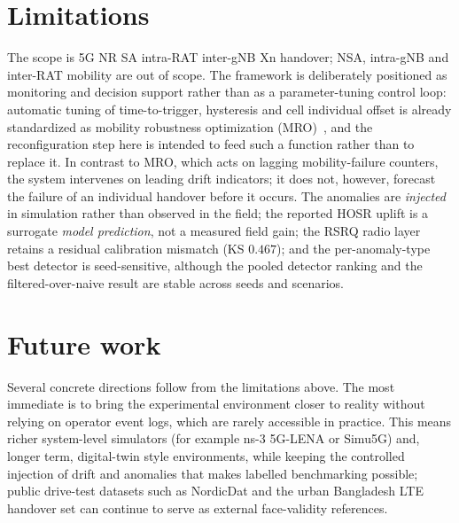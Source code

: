 \section{Limitations}

The scope is 5G NR SA intra-RAT inter-gNB Xn handover; NSA, intra-gNB and
inter-RAT mobility are out of scope. The framework is deliberately positioned as
monitoring and decision support rather than as a parameter-tuning control loop:
automatic tuning of time-to-trigger, hysteresis and cell individual offset is
already standardized as mobility robustness optimization (MRO)~\cite{tr36839,ts28313},
and the reconfiguration step here is intended to feed such a function rather than
to replace it. In contrast to MRO, which acts on lagging mobility-failure
counters, the system intervenes on leading drift indicators; it does not,
however, forecast the failure of an individual handover before it occurs. The
anomalies are \emph{injected} in
simulation rather than observed in the field; the reported HOSR uplift is a
surrogate \emph{model prediction}, not a measured field gain; the RSRQ radio
layer retains a residual calibration mismatch (KS $0.467$); and the
per-anomaly-type best detector is seed-sensitive, although the pooled detector
ranking and the filtered-over-naive result are stable across seeds and scenarios.

\section{Future work}

Several concrete directions follow from the limitations above. The most immediate
is to bring the experimental environment closer to reality without relying on
operator event logs, which are rarely accessible in practice. This means richer
system-level simulators (for example ns-3 5G-LENA or Simu5G) and, longer term,
digital-twin style environments, while keeping the controlled injection of drift
and anomalies that makes labelled benchmarking possible; public drive-test
datasets such as NordicDat and the urban Bangladesh LTE handover set can continue
to serve as external face-validity references.

